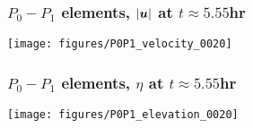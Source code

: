 
\begin{frame}[t]
  \frametitle{$P_0-P_1$ elements, $|{\boldsymbol{u}}|$ at $t\approx 5.55$hr}
\vspace{-0.2in}
  \begin{center}
    \texttt{[image: figures/P0P1\_velocity\_0020]}
  \end{center}
\end{frame}

\begin{frame}[t]
  \frametitle{$P_0-P_1$ elements, $\eta$ at $t\approx 5.55$hr}
\vspace{-0.2in}
  \begin{center}
    \texttt{[image: figures/P0P1\_elevation\_0020]}
  \end{center}
\end{frame}
